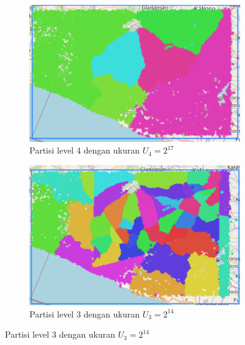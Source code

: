 \begin{figure}[h]
    \begin{subfigure}[b]{0.45\textwidth}
        \centering
        \includegraphics[width=\linewidth]{figures/partition_level_4.png}
        \caption{Partisi level 4 dengan ukuran $U_4=2^{17}$}
        \label{fig:c}
    \end{subfigure}
    \hfill
    \begin{subfigure}[b]{0.45\textwidth}
        \centering
        \includegraphics[width=\linewidth]{figures/partition_level_3.png}
        \caption{Partisi level 3 dengan ukuran $U_3=2^{14}$}
        \label{fig:d}
    \end{subfigure}


\end{figure}
